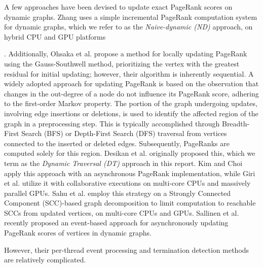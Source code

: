 A few approaches have been devised to update exact PageRank scores on dynamic graphs. Zhang \cite{rank-zhang17} uses a simple incremental PageRank computation system for dynamic graphs, which we refer to as the \textit{Naive-dynamic (ND)} approach, on hybrid CPU and GPU platforms. Additionally, Ohsaka et al. \cite{ohsaka2015efficient} propose a method for locally updating PageRank using the Gauss-Southwell method, prioritizing the vertex with the greatest residual for initial updating; however, their algorithm is inherently sequential. A widely adopted approach for updating PageRank \cite{rank-desikan05, kim2015incremental, rank-giri20, sahu2022dynamic} is based on the observation that changes in the out-degree of a node do not influence its PageRank score, adhering to the first-order Markov property. The portion of the graph undergoing updates, involving edge insertions or deletions, is used to identify the affected region of the graph in a preprocessing step. This is typically accomplished through Breadth-First Search (BFS) or Depth-First Search (DFS) traversal from vertices connected to the inserted or deleted edges. Subsequently, PageRanks are computed solely for this region. Desikan et al. \cite{rank-desikan05} originally proposed this, which we term as the \textit{Dynamic Traversal (DT)} approach in this report. Kim and Choi \cite{kim2015incremental} apply this approach with an asynchronous PageRank implementation, while Giri et al. \cite{rank-giri20} utilize it with collaborative executions on multi-core CPUs and massively parallel GPUs. Sahu et al. \cite{sahu2022dynamic} employ this strategy on a Strongly Connected Component (SCC)-based graph decomposition to limit computation to reachable SCCs from updated vertices, on multi-core CPUs and GPUs. Sallinen et al. \cite{sallinen2023real} recently proposed an event-based approach for asynchronously updating PageRank scores of vertices in dynamic graphs. However, their per-thread event processing and termination detection methods are relatively complicated.

